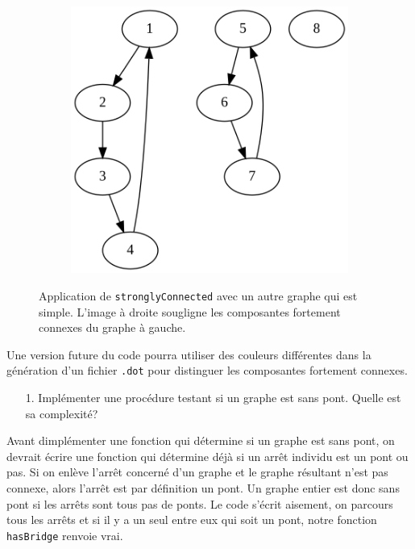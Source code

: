 \documentclass[10pt]{article} %
\begin{document}
\begin{figure}[h!]
\begin{subfigure}{0.45\textwidth}
        \includegraphics[width=\textwidth]{media/scc_s.png}
    \end{subfigure}
    \caption{Application de \texttt{stronglyConnected} avec un autre graphe qui est simple. L'image à droite sougligne les composantes
    fortement connexes du graphe à gauche.}
    \label{Fig:scc2}

\end{figure}

Une version future du code pourra utiliser des couleurs différentes dans la génération d'un fichier \texttt{.dot}
pour distinguer les composantes fortement connexes.

\vspace{.5cm}
\noindent {} 

\begin{itemize}
    \item [1.] Implémenter une procédure testant si un graphe est sans pont. Quelle est sa complexité?
\end{itemize}

Avant dimplémenter une fonction qui détermine si un graphe est sans pont, on devrait écrire une fonction qui détermine déjà si un arrêt individu est
un pont ou pas. Si on enlève l'arrêt concerné d'un graphe et le graphe résultant n'est pas connexe, alors l'arrêt est par définition un pont.  Un graphe entier est donc
sans pont si les arrêts sont tous pas de ponts. Le code s'écrit aisement, on parcours tous les arrêts et si il y a un seul entre eux qui soit un pont,
notre fonction \texttt{hasBridge} renvoie vrai.
\end{document}
